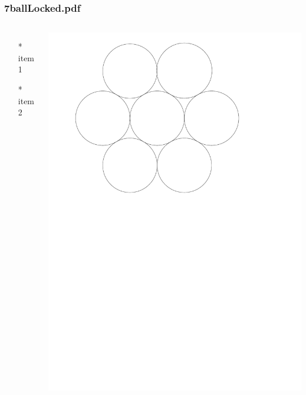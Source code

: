 \begin{frame} \frametitle{7ballLocked.pdf}
    \begin{columns}[c]
        \begin{itemize}
            \item[*] item 1
            \item[*] item 2
        \end{itemize}
        \begin{minipage}{\linewidth}
            \begin{center}
            \includegraphics[width=.9\textwidth]{graphics/7ballLocked.pdf}
            \label{gfx:7ballLocked.pdf}
            \end{center}
        \end{minipage}
    \end{columns}
\end{frame}
